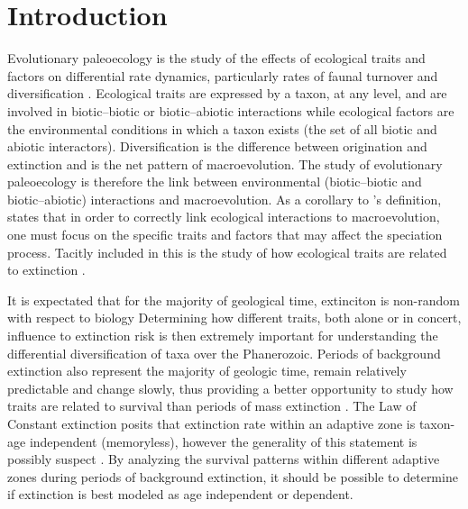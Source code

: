 \documentclass[12pt,letterpaper]{article}
\begin{document}
\section{Introduction}
%
Evolutionary paleoecology is the study of the effects of ecological traits and factors on differential rate dynamics, particularly rates of faunal turnover and diversification \citep{Kitchell1985a}. Ecological traits are expressed by a taxon, at any level, and are involved in biotic--biotic or biotic--abiotic interactions while ecological factors are the environmental conditions in which a taxon exists (the set of all biotic and abiotic interactors). Diversification is the difference between origination and extinction and is the net pattern of macroevolution. The study of evolutionary paleoecology is therefore the link between environmental (biotic--biotic and biotic--abiotic) interactions and macroevolution. As a corollary to \citet{Kitchell1985a}'s definition, \citet{Allmon1994} states that in order to correctly link ecological interactions to macroevolution, one must focus on the specific traits and factors that may affect the speciation process. Tacitly included in this is the study of how ecological traits are related to extinction \citep{Kitchell1990}.

It is expectated that for the majority of geological time, extinciton is non-random with respect to biology \citep{Jablonski1986} Determining how different traits, both alone or in concert, influence to extinction risk is then extremely important for understanding the differential diversification of taxa over the Phanerozoic. Periods of background extinction also represent the majority of geologic time, remain relatively predictable and change slowly, thus providing a better opportunity to study how traits are related to survival than periods of mass extinction \citep{Jablonski1986,Raup1988}. The Law of Constant extinction \citep{VanValen1973} posits that extinction rate within an adaptive zone is taxon-age independent (memoryless), however the generality of this statement is possibly suspect \citep{Drake2014,Raup1975,Sepkoski1975,Finnegan2008}. By analyzing the survival patterns within different adaptive zones during periods of background extinction, it should be possible to determine if extinction is best modeled as age independent or dependent.
\end{document}

